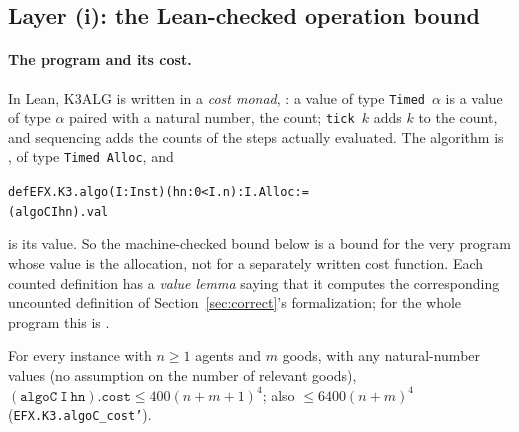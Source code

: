 \documentclass[runningheads,11pt]{llncs}
\begin{document}
\subsection{Layer (i): the Lean-checked operation bound}\label{sec:leanbound}

\paragraph{The program and its cost.} In Lean, K3ALG is written in a \emph{cost monad}, : a value of type \texttt{Timed}~$\alpha$ is a value of type $\alpha$ paired with a natural number, the count; \texttt{tick~$k$} adds $k$ to the count, and sequencing adds the counts of the steps actually evaluated. The algorithm is , of type \texttt{Timed}~\texttt{Alloc}, and
\begin{alltt}
def EFX.K3.algo (I : Inst) (hn : 0 < I.n) : I.Alloc :=
  (algoC I hn).val
\end{alltt}
is its value. So the machine-checked bound below is a bound for the very program whose value is the allocation, not for a separately written cost function. Each counted definition has a \emph{value lemma} saying that it computes the corresponding uncounted definition of Section~\ref{sec:correct}'s formalization; for the whole program this is .

\begin{theorem}\label{thm:time}
For every instance with $n\ge1$ agents and $m$ goods, with any natural-number values (no assumption on the number of relevant goods), $\mathtt{(algoC\ I\ hn).cost}\le400(n+m+1)^4$; also $\le6400(n+m)^4$ (\texttt{EFX.K3.algoC\_cost'}).
\end{theorem}
\end{document}
